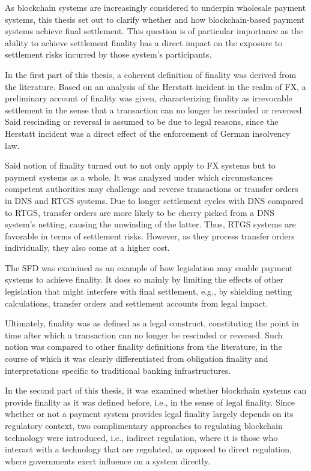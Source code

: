 As blockchain systems are increasingly considered to underpin wholesale payment systems, this thesis set out to clarify whether and how blockchain-based payment systems achieve final settlement.
This question is of particular importance as the ability to achieve settlement finality has a direct impact on the exposure to settlement risks incurred by those system's participants.

In the first part of this thesis, a coherent definition of finality was derived from the literature.
Based on an analysis of the Herstatt incident in the realm of FX, a preliminary account of finality was given, characterizing finality as irrevocable settlement in the sense that a transaction can no longer be rescinded or reversed.
Said rescinding or reversal is assumed to be due to legal reasons, since the Herstatt incident was a direct effect of the enforcement of German insolvency law.

Said notion of finality turned out to not only apply to FX systems but to payment systems as a whole.
It was analyzed under which circumstances competent authorities may challenge and reverse transactions or transfer orders in DNS and RTGS systems.
Due to longer settlement cycles with DNS compared to RTGS, transfer orders are more likely to be cherry picked from a DNS system's netting, causing the unwinding of the latter.
Thus, RTGS systems are favorable in terms of settlement risks.
However, as they process transfer orders individually, they also come at a higher cost.

The SFD was examined as an example of how legislation may enable payment systems to achieve finality.
It does so mainly by limiting the effects of other legislation that might interfere with final settlement, e.g., by shielding netting calculations, transfer orders and settlement accounts from legal impact.

Ultimately, finality was as defined as a legal construct, constituting the point in time after which a transaction can no longer be rescinded or reversed.
Such notion was compared to other finality definitions from the literature, in the course of which it was clearly differentiated from obligation finality and interpretations specific to traditional banking infrastructures.

In the second part of this thesis, it was examined whether blockchain systems can provide finality as it was defined before, i.e., in the sense of legal finality.
Since whether or not a payment system provides legal finality largely depends on its regulatory context, two complimentary approaches to regulating blockchain technology were introduced, i.e., indirect regulation, where it is those who interact with a technology that are regulated, as opposed to direct regulation, where governments exert influence on a system directly. 


